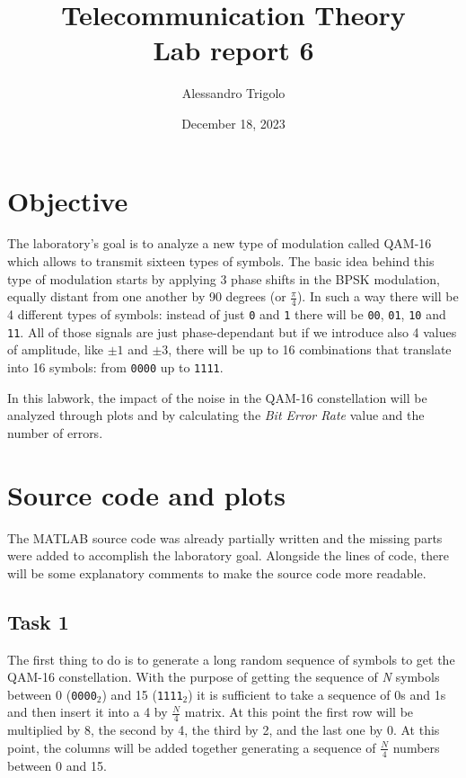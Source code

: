 \title{\vspace{160px} \textbf{\huge{Telecommunication Theory}} \\\vspace{17.5px} \LARGE{Lab report 6}  \vspace{10px}}
\author{Alessandro Trigolo}
\date{December 18, 2023}




\maketitle\newpage

 
\section*{Objective}
The laboratory's goal is to analyze a new type of modulation called QAM-16 which allows to transmit sixteen types of symbols. The basic idea behind this type of modulation starts by applying 3 phase shifts in the BPSK modulation, equally distant from one another by 90 degrees (or $\frac{\pi}{4}$). In such a way there will be 4 different types of symbols: instead of just \texttt{0} and \texttt{1} there will be \texttt{00}, \texttt{01}, \texttt{10} and \texttt{11}. All of those signals are just phase-dependant but if we introduce also 4 values of amplitude, like $\pm1$ and $\pm3$, there will be up to 16 combinations that translate into 16 symbols: from \texttt{0000} up to \texttt{1111}.

In this labwork, the impact of the noise in the QAM-16 constellation will be analyzed through plots and by calculating the \textsl{Bit Error Rate} value and the number of errors. 

\section*{Source code and plots}
\lstset{style = MatLab}
The MATLAB source code was already partially written and the missing parts were added to accomplish the laboratory goal. Alongside the lines of code, there will be some explanatory comments to make the source code more readable.

% 
\subsection*{Task 1}
The first thing to do is to generate a long random sequence of symbols to get the QAM-16 constellation. With the purpose of getting the sequence of \textit{N} symbols between 0 (\texttt{0000}$_2$) and 15 (\texttt{1111}$_2$) it is sufficient to take a sequence of 0s and 1s and then insert it into a 4 by $\frac{N}{4}$ matrix. At this point the first row will be multiplied by 8, the second by 4, the third by 2, and the last one by 0. At this point, the columns will be added together generating a sequence of $\frac{N}{4}$ numbers between 0 and 15.

